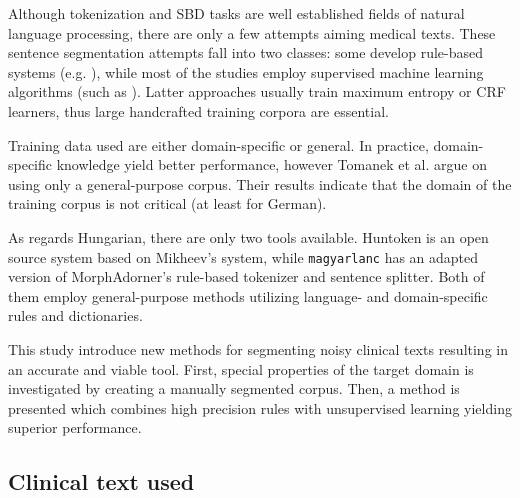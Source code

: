 Although tokenization and SBD tasks are well established fields of natural language processing, there are only a few attempts aiming medical texts. 
These sentence segmentation attempts fall into two classes: some develop rule-based systems (e.g. \cite{XuSDJWD10}), while most of the studies employ supervised machine learning algorithms (such as \cite{apostolova2009automatic,cho2002text,Savova2010,taira2001automatic,tomanek2007sentence}).
Latter approaches usually train maximum entropy or CRF learners, thus large handcrafted training corpora are essential. 

Training data used are either domain-specific or general. 
In practice, domain-specific knowledge yield better performance, however Tomanek et al.  \cite{tomanek2006reappraisal} argue on using only a general-purpose corpus. 
Their results indicate that the domain of the training corpus is not critical (at least for German).

As regards Hungarian, there are only two tools available. 
Huntoken \cite{Halacsy2004} is an open source system based on Mikheev’s system, while \texttt{magyarlanc} \cite{zsibrata2013magyarlanc} has an adapted version of MorphAdorner’s rule-based tokenizer \cite{kumar2009monk} and sentence splitter. 
Both of them employ general-purpose methods utilizing language- and domain-specific rules and dictionaries.

This study introduce new methods for segmenting noisy clinical texts resulting in an accurate and viable tool.
First, special properties of the target domain is investigated by creating a manually segmented corpus. 
Then, a method is presented which combines high precision rules with unsupervised learning yielding superior performance.

\subsection{Clinical text used}
\label{sec:clin_corpus}

